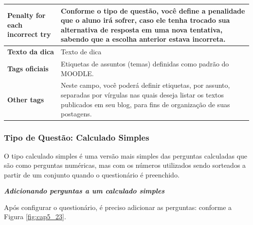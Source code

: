 \begin{longtable}{p{6cm}|p{9cm}}
    \textbf{Penalty for each incorrect try} &  Conforme o tipo de questão, você define a penalidade que o aluno irá sofrer, caso ele tenha trocado sua alternativa de resposta em uma nova tentativa, sabendo que a escolha anterior estava incorreta.  \\\hline
    \textbf{Texto da dica} & Texto de dica  \\\hline
    \textbf{Tags oficiais} &  Etiquetas de assuntos (temas) definidas como padrão do MOODLE.\\\hline
    \textbf{Other tags} &  Neste campo, você poderá definir  etiquetas,  por assunto, separadas por vírgulas nas quais deseja listar os textos publicados em seu blog, para fins de organização de suas postagens. \\\hline
\end{longtable}%

\subsubsection{Tipo de Questão: Calculado Simples}

O tipo calculado simples é uma versão mais simples das perguntas calculadas que são como perguntas numéricas, mas com os números utilizados sendo sorteados a partir de um conjunto quando o questionário é preenchido.

 \textit{\textbf{Adicionando perguntas a um calculado simples}}

Após configurar o questionário, é preciso adicionar as perguntas: conforme a Figura \ref{fig:cap5_23}.

